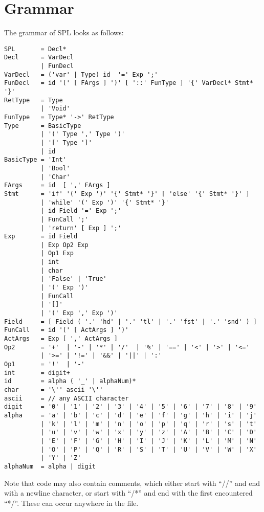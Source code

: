 \chapter{Grammar}\label{appendix:grammar}
The grammar of SPL looks as follows:

\begin{lstlisting}[language=spl]
SPL       = Decl*
Decl      = VarDecl
          | FunDecl
VarDecl   = ('var' | Type) id  '=' Exp ';'
FunDecl   = id '(' [ FArgs ] ')' [ '::' FunType ] '{' VarDecl* Stmt* '}'
RetType   = Type
          | 'Void'
FunType   = Type* '->' RetType
Type      = BasicType
          | '(' Type ',' Type ')'
          | '[' Type ']'
          | id
BasicType = 'Int'
          | 'Bool'
          | 'Char'
FArgs     = id  [ ',' FArgs ]
Stmt      = 'if' '(' Exp ')' '{' Stmt* '}' [ 'else' '{' Stmt* '}' ]
          | 'while' '(' Exp ')' '{' Stmt* '}'
          | id Field '=' Exp ';'
          | FunCall ';'
          | 'return' [ Exp ] ';'
Exp       = id Field
          | Exp Op2 Exp
          | Op1 Exp
          | int
          | char
          | 'False' | 'True'
          | '(' Exp ')'
          | FunCall
          | '[]'
          | '(' Exp ',' Exp ')'
Field     = [ Field ( '.' 'hd' | '.' 'tl' | '.' 'fst' | '.' 'snd' ) ]
FunCall   = id '(' [ ActArgs ] ')'
ActArgs   = Exp [ ',' ActArgs ]
Op2       = '+'  | '-' | '*' | '/'  | '%' | '==' | '<' | '>' | '<='
          | '>=' | '!=' | '&&' | '||' | ':'
Op1       = '!'  | '-'
int       = digit+
id        = alpha ( '_' | alphaNum)*
char      = '\'' ascii '\''
ascii     = // any ASCII character
digit     = '0' | '1' | '2' | '3' | '4' | '5' | '6' | '7' | '8' | '9'
alpha     = 'a' | 'b' | 'c' | 'd' | 'e' | 'f' | 'g' | 'h' | 'i' | 'j'
          | 'k' | 'l' | 'm' | 'n' | 'o' | 'p' | 'q' | 'r' | 's' | 't'
          | 'u' | 'v' | 'w' | 'x' | 'y' | 'z' | 'A' | 'B' | 'C' | 'D'
          | 'E' | 'F' | 'G' | 'H' | 'I' | 'J' | 'K' | 'L' | 'M' | 'N'
          | 'O' | 'P' | 'Q' | 'R' | 'S' | 'T' | 'U' | 'V' | 'W' | 'X'
          | 'Y' | 'Z'
alphaNum  = alpha | digit
\end{lstlisting}

Note that code may also contain comments, which either start with ``//'' and end with a newline character, or start with ``/*'' and end with the first encountered ``*/''. These can occur anywhere in the file.

